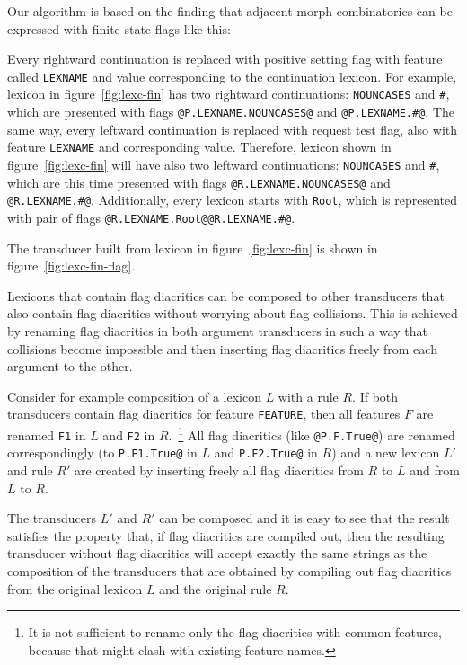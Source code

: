 \documentclass[11pt]{article}
\begin{document}
Our algorithm is based on the finding that adjacent morph combinatorics can be expressed with finite-state flags like this:

Every rightward continuation is replaced with positive setting flag with feature called \texttt{LEXNAME} and value corresponding to the continuation lexicon. For example, lexicon in figure~\ref{fig:lexc-fin} has two rightward continuations: \texttt{NOUNCASES} and \texttt{\#}, which are presented with flags \verb+@P.LEXNAME.NOUNCASES@+ and \verb+@P.LEXNAME.#@+. 
The same way, every leftward continuation is replaced with request test flag, also with feature \texttt{LEXNAME} and corresponding value. Therefore, lexicon shown in figure~\ref{fig:lexc-fin} will have also two leftward continuations: \texttt{NOUNCASES} and \texttt{\#}, which are this time presented with flags \verb+@R.LEXNAME.NOUNCASES@+ and \verb+@R.LEXNAME.#@+. Additionally, every lexicon starts with \texttt{Root}, which is represented with pair of flags \verb+@R.LEXNAME.Root@@R.LEXNAME.#@+.

The transducer built from lexicon in figure~\ref{fig:lexc-fin} is shown in figure~\ref{fig:lexc-fin-flag}. 


Lexicons that contain flag diacritics can be composed to other
transducers that also contain flag diacritics without worrying about
flag collisions. This is achieved by renaming flag diacritics in both
argument transducers in such a way that collisions become impossible
and then inserting flag diacritics freely from each argument to the
other.

Consider for example composition of a lexicon $L$ with a rule $R$. If
both transducers contain flag diacritics for feature {\tt FEATURE},
then all features $F$ are renamed {\tt F1} in $L$ and {\tt F2} in
$R$.~\footnote{It is not sufficient to rename only the flag diacritics
  with common features, because that might clash with existing feature
  names.} All flag diacritics (like {\tt @P.F.True@}) are renamed
correspondingly (to {\tt P.F1.True@} in $L$ and {\tt P.F2.True@} in
$R$) and a new lexicon $L'$ and rule $R'$ are created by inserting
freely all flag diacritics from $R$ to $L$ and from $L$ to $R$.

The transducers $L'$ and $R'$ can be composed and it is easy to
see that the result satisfies the property that, if flag diacritics
are compiled out, then the resulting transducer without flag
diacritics will accept exactly the same strings as the composition of
the transducers that are obtained by compiling out flag diacritics
from the original lexicon $L$ and the original rule $R$.
\end{document}
